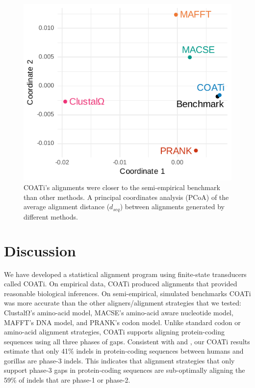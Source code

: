 \documentclass[12pt,letterpaper]{article}
\begin{document}
\begin{figure}[h!]
    \centering%
    \includegraphics{figures/fig-dseq-benchmarks.pdf}
    \par
    \caption{COATi's alignments were closer to the semi-empirical benchmark than other methods. A principal coordinates analysis (PCoA) of the average alignment distance ($d_{seq}$) between alignments generated by different methods.
%
    \label{fig:dseq-benchmarks}}
\end{figure}

\clearpage

\section*{Discussion}

We have developed a statistical alignment program using finite-state transducers called COATi. On empirical data, COATi produced alignments that provided reasonable biological inferences. On semi-empirical, simulated benchmarks COATi was more accurate than the other aligners/alignment strategies that we tested: ClustalΩ's amino-acid model, MACSE's amino-acid aware nucleotide model, MAFFT's DNA model, and PRANK's codon model. Unlike standard codon or amino-acid alignment strategies, COATi supports aligning protein-coding sequences using all three phases of gaps. Consistent with \cite{taylor2004occurrence} and \cite{zhu2022profiling}, our COATi results estimate that only 41\% indels in protein-coding sequences between humans and gorillas are phase-3 indels. This indicates that alignment strategies that only support phase-3 gaps in protein-coding sequences are sub-optimally aligning the 59\% of indels that are phase-1 or phase-2.
\end{document}
